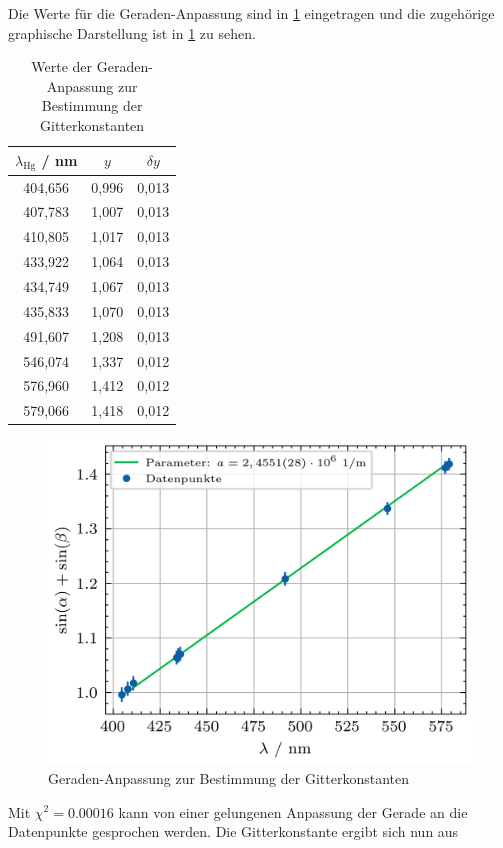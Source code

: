 Die Werte für die Geraden-Anpassung sind in \cref{tab:geraden_fit_gitterkonstante} eingetragen und die zugehörige graphische Darstellung ist in \cref{fig:geraden_fit_gitterkonstante}
zu sehen.
\begin{table}[H]
    \centering
    \caption{Werte der Geraden-Anpassung zur Bestimmung der Gitterkonstanten}
    \begin{tabular}{c|c|c}
        $\lambda_{\mathrm{Hg}}$ / \unit{\nano \meter} & $y$ & $\delta y$\\
        \hline
        404,656 & 0,996 & 0,013 \\
        407,783 & 1,007 & 0,013 \\
        410,805 & 1,017 & 0,013 \\
        433,922 & 1,064 & 0,013 \\
        434,749 & 1,067 & 0,013 \\
        435,833 & 1,070 & 0,013 \\
        491,607 & 1,208 & 0,013 \\
        546,074 & 1,337 & 0,012 \\
        576,960 & 1,412 & 0,012 \\
        579,066 & 1,418 & 0,012
    \end{tabular}\label{tab:geraden_fit_gitterkonstante}
\end{table}
\begin{figure}[H]
	\centering
	\includegraphics[width=0.8\linewidth]{../figs/gitterkonstante_fit.png}
	\caption{Geraden-Anpassung zur Bestimmung der Gitterkonstanten}
	\label{fig:geraden_fit_gitterkonstante}
\end{figure} Mit $\chi^2 = 0.00016$ kann von einer gelungenen Anpassung der Gerade an die Datenpunkte gesprochen werden. Die Gitterkonstante ergibt sich nun aus
